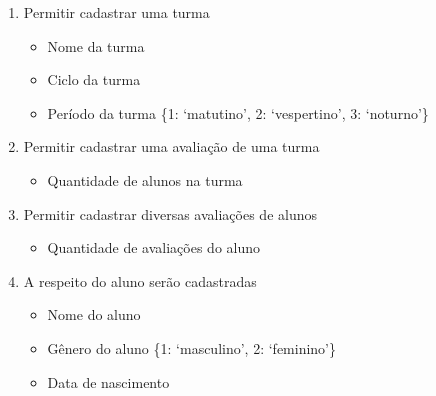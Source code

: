 \documentclass[a4paper,12pt]{report}
\begin{document}
        \begin{enumerate}
            
            \item Permitir cadastrar uma turma

                \begin{itemize}
                    
                    \item Nome da turma

                    \item Ciclo da turma

                    \item Período da turma \{1: `matutino', 2: `vespertino',
                        3: `noturno'\}

                \end{itemize}

            \item Permitir cadastrar uma avaliação de uma turma

                \begin{itemize}
                    
                    \item Quantidade de alunos na turma

                \end{itemize}

            \item Permitir cadastrar diversas avaliações de alunos

                \begin{itemize}
                    
                    \item Quantidade de avaliações do aluno

                \end{itemize}
            
            \item A respeito do aluno serão cadastradas

                \begin{itemize}

                    \item Nome do aluno

                    \item Gênero do aluno \{1: `masculino', 2: `feminino'\}

                    \item Data de nascimento


\end{itemize}
\end{enumerate}
\end{document}
